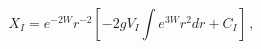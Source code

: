 \begin{equation}
X_I = e^{-2W} r^{-2} [-2 g V_I  \int e^{3W} r^2 dr + C_I]\,, \label{X_IW}
\end{equation}


